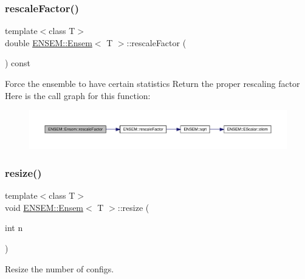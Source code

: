 \subsubsection{\texorpdfstring{rescaleFactor()}{rescaleFactor()}\hspace{0.1cm}{\footnotesize\ttfamily [2/2]}}
{\footnotesize\ttfamily template$<$class T$>$ \\
double \mbox{\hyperlink{classENSEM_1_1Ensem}{E\+N\+S\+E\+M\+::\+Ensem}}$<$ T $>$\+::rescale\+Factor (\begin{DoxyParamCaption}{ }\end{DoxyParamCaption}) const\hspace{0.3cm}{\ttfamily [inline]}}

Force the ensemble to have certain statistics Return the proper rescaling factor Here is the call graph for this function\+:
\nopagebreak
\begin{figure}[H]
\begin{center}
\leavevmode
\includegraphics[width=350pt]{d7/d3e/classENSEM_1_1Ensem_aecf90199daafa73454e9c1aceef313a4_cgraph}
\end{center}
\end{figure}
\mbox{\label{classENSEM_1_1Ensem_ae43aa68aaca92143baffe83310657f4a}} 
\subsubsection{\texorpdfstring{resize()}{resize()}\hspace{0.1cm}{\footnotesize\ttfamily [1/4]}}
{\footnotesize\ttfamily template$<$class T$>$ \\
void \mbox{\hyperlink{classENSEM_1_1Ensem}{E\+N\+S\+E\+M\+::\+Ensem}}$<$ T $>$\+::resize (\begin{DoxyParamCaption}\item[{int}]{n }\end{DoxyParamCaption})\hspace{0.3cm}{\ttfamily [inline]}}



Resize the number of configs. 

